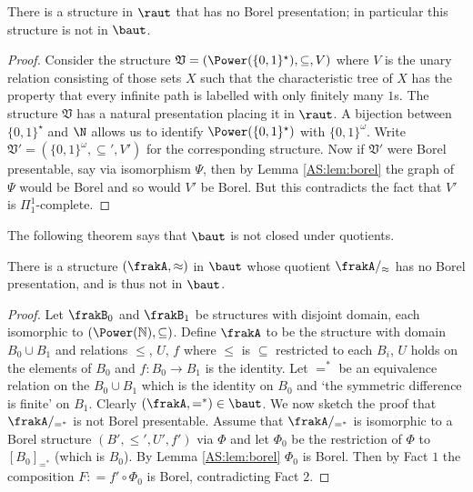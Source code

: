 \begin{theorem} \label{AS:thm:sep}
There is a structure in $\raut$ that has no Borel presentation; in particular this structure is not in $\baut$.
\end{theorem}

\begin{proof}
Consider the structure $\mathfrak{V} = (\Power(\{0,1\}^\star),\subseteq,V)$ where $V$ is the unary relation consisting of those sets $X$ such that
the characteristic tree of $X$ has the property that every infinite path is labelled with only finitely many $1$s. The structure $\mathfrak{V}$ has a natural presentation placing it in $\raut$. A bijection between $\{0,1\}^\star$ and $\N$ allows us to identify $\Power(\{0,1\}^\star)$ with $\{0,1\}^\omega$.
Write $\mathfrak{V'} = (\{0,1\}^\omega,\subseteq',V')$ for the corresponding structure. 
Now if $\mathfrak{V'}$ were Borel presentable, say via isomorphism $\Psi$, then by Lemma \ref{AS:lem:borel} the graph of $\Psi$ would be Borel and so would $V'$ be Borel. But this contradicts the fact that $V'$ is $\Pi_1^1$-complete. 
\end{proof}

The following theorem says that $\baut$ is not closed under quotients.

\begin{theorem} \label{AS:thm:borel}
There is a structure $(\frakA,\approx)$ in $\baut$ whose quotient $\frakA/_{\approx}$ has no Borel presentation, and is thus not in $\baut$.
\end{theorem}

\begin{proof}
Let $\frakB_0$ and $\frakB_1$ be structures with disjoint domain, each isomorphic to $(\Power(\mathbb{N}),\subseteq)$.
Define $\frakA$ to be the structure with domain $B_0 \cup B_1$ and relations $\leq$, $U$, $f$ where $\leq$ is
$\subseteq$ restricted to each $B_i$, $U$ holds on the elements of $B_0$ and $f:B_0 \to B_1$ is the identity. Let $=^*$ be an equivalence
relation on the $B_0 \cup B_1$ which is the identity on $B_0$ and `the symmetric difference is finite' on $B_1$. Clearly 
$(\frakA,=^*) \in \baut$. We now sketch the proof that $\frakA/_{=^*}$ is not Borel presentable. 
Assume that $\frakA/_{=^*}$ is isomorphic to a Borel structure $(B',\leq',U',f')$ via $\Phi$ and let $\Phi_0$ be the restriction of 
$\Phi$ to $[B_0]_{=^*}$ (which is $B_0$). By Lemma \ref{AS:lem:borel} $\Phi_0$ is Borel.
Then  by Fact $1$ the composition $F: = f' \circ \Phi_0$ is Borel, contradicting Fact $2$.
\end{proof}

